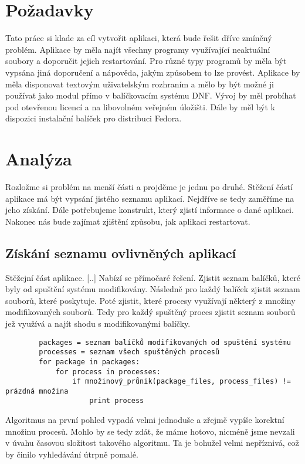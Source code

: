 \documentclass[10pt,a4paper]{article}
\begin{document}
	\section{Požadavky}
	Tato práce si klade za cíl vytvořit aplikaci, která bude řešit dříve zmíněný problém. Aplikace by měla najít všechny programy využívající neaktuální soubory a doporučit jejich restartování. Pro různé typy programů by měla být vypsána jiná doporučení a nápověda, jakým způsobem to lze provést. Aplikace by měla disponovat textovým uživatelským rozhraním a mělo by být možné ji používat jako modul přímo v balíčkovacím systému DNF\@. Vývoj by měl probíhat pod otevřenou licencí a na libovolném veřejném úložišti. Dále by měl být k dispozici instalační balíček pro distribuci Fedora.

	\section{Analýza}
	Rozložme si problém na menší části a projděme je jednu po druhé. Stěžení částí aplikace má být vypsání jistého seznamu aplikací. Nejdříve se tedy zaměříme na jeho získání. Dále potřebujeme konstrukt, který zjistí informace o  dané aplikaci. Nakonec nás bude zajímat zjištění způsobu, jak aplikaci restartovat.
	
		\subsection{Získání seznamu ovlivněných aplikací}
		Stěžejní část aplikace. [..] Nabízí se přímočaré řešení. Zjistit seznam balíčků, které byly od spuštění systému modifikovány. Následně pro každý balíček zjistit seznam souborů, které poskytuje. Poté zjistit, které procesy využívají některý z množiny modifikovaných souborů. Tedy pro každý spuštěný proces zjistit seznam souborů jež využívá a najít shodu s modifikovanými balíčky.
		
		\begin{verbatim}
		packages = seznam balíčků modifikovaných od spuštění systému
		processes = seznam všech spuštěných procesů
		for package in packages:
			for process in processes:
				if množinový_průnik(package_files, process_files) != prázdná množina
					print process		
		\end{verbatim}
		
		Algoritmus na první pohled vypadá velmi jednoduše a zřejmě vypíše korektní množinu procesů. Mohlo by se tedy zdát, že máme hotovo, nicméně jsme nevzali v úvahu časovou složitost takového algoritmu. Ta je bohužel velmi nepříznivá, což by činilo vyhledávání útrpně pomalé.
		
\end{document}
